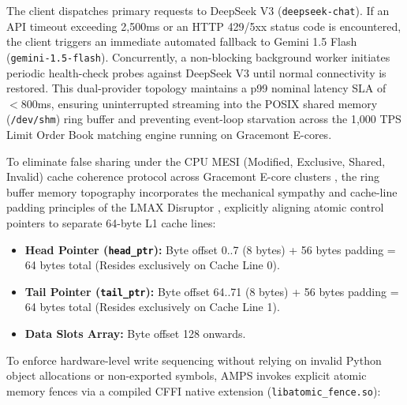 The client dispatches primary requests to DeepSeek V3 (\texttt{deepseek-chat}). If an API timeout exceeding 2,500ms or an HTTP 429/5xx status code is encountered, the client triggers an immediate automated fallback to Gemini 1.5 Flash (\texttt{gemini-1.5-flash}). Concurrently, a non-blocking background worker initiates periodic health-check probes against DeepSeek V3 until normal connectivity is restored. This dual-provider topology maintains a p99 nominal latency SLA of $< 800$ms, ensuring uninterrupted streaming into the POSIX shared memory (\texttt{/dev/shm}) ring buffer and preventing event-loop starvation across the 1,000 TPS Limit Order Book matching engine running on Gracemont E-cores.

To eliminate false sharing under the CPU MESI (Modified, Exclusive, Shared, Invalid) cache coherence protocol across Gracemont E-core clusters \cite{drepper2007memory}, the ring buffer memory topography incorporates the mechanical sympathy and cache-line padding principles of the LMAX Disruptor \cite{thompson2011disruptor}, explicitly aligning atomic control pointers to separate 64-byte L1 cache lines:
\begin{itemize}
    \item \textbf{Head Pointer (\texttt{head\_ptr}):} Byte offset 0..7 (8 bytes) + 56 bytes padding = 64 bytes total (Resides exclusively on Cache Line 0).
    \item \textbf{Tail Pointer (\texttt{tail\_ptr}):} Byte offset 64..71 (8 bytes) + 56 bytes padding = 64 bytes total (Resides exclusively on Cache Line 1).
    \item \textbf{Data Slots Array:} Byte offset 128 onwards.
\end{itemize}

To enforce hardware-level write sequencing without relying on invalid Python object allocations or non-exported symbols, AMPS invokes explicit atomic memory fences via a compiled CFFI native extension (\texttt{libatomic\_fence.so}):

\vspace{\baselineskip}

